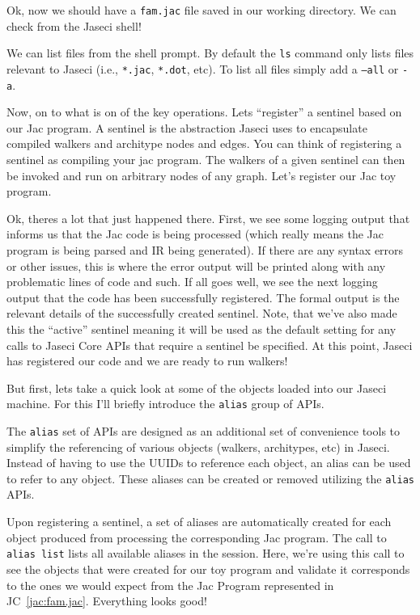 \par
Ok, now we should have a \texttt{fam.jac} file saved in our working directory. We can check from the Jaseci shell!
\par
{}
\par
We can list files from the shell prompt. By default the \texttt{ls} command only lists files relevant to Jaseci (i.e., \texttt{*.jac}, \texttt{*.dot}, etc). To list all files simply add a \texttt{--all} or \texttt{-a}.
\par
Now, on to what is on of the key operations. Lets ``register'' a \gls{sentinel} based on our Jac program. A sentinel is the abstraction Jaseci uses to encapsulate compiled walkers and architype nodes and edges. You can think of registering a sentinel as compiling your jac program. The walkers of a given sentinel can then be invoked and run on arbitrary nodes of any graph. Let's register our Jac toy program.
\par
{}
\par
Ok, theres a lot that just happened there. First, we see some logging output that informs us that the Jac code is being processed (which really means the Jac program is being parsed and IR being generated). If there are any syntax errors or other issues, this is where the error output will be printed along with any problematic lines of code and such. If all goes well, we see the next logging output that the code has been successfully registered. The formal output is the relevant details of the successfully created sentinel. Note, that we've also made this the ``active'' sentinel meaning it will be used as the default setting for any calls to Jaseci Core APIs that require a sentinel be specified. At this point, Jaseci has registered our code and we are ready to run walkers!
\par
But first, lets take a quick look at some of the objects loaded into our Jaseci machine. For this I'll briefly introduce the \texttt{alias} group of APIs.
\par
{}
\par
The \texttt{alias} set of APIs are designed as an additional set of convenience tools to simplify the referencing of various objects (walkers, architypes, etc) in Jaseci. Instead of having to use the UUIDs to reference each object, an alias can be used to refer to any object. These aliases can be created or removed utilizing the \texttt{alias} APIs.
\par
Upon registering a sentinel, a set of aliases are automatically created for each object produced from processing the corresponding Jac program. The call to \texttt{alias list} lists all available aliases in the session. Here, we're using this call to see the objects that were created for our toy program and validate it corresponds to the ones we would expect from the Jac Program represented in JC~\ref{jac:fam.jac}. Everything looks good!
